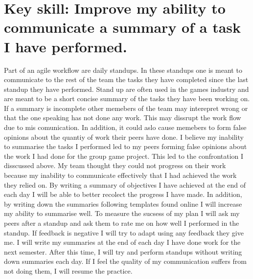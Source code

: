 \documentclass{scrartcl}
\begin{document}
\section{Key skill: Improve my ability to communicate a summary of a task I have performed.}
Part of an agile workflow are daily standups. In these standups one is meant to communicate to the rest of the team the tasks they have completed since the last standup they have performed. Stand up are often used in the games industry and are meant to be a short concise summary of the tasks they have been working on. If a summary is incomplete other memebers of the team may interepret wrong or that the one speaking has not done any work. This may dissrupt the work flow due to mis comunication. In addition, it could aslo cause memebers to form false opinions about the quantiy of work their peers have done. I believe my inability to summarise the tasks I performed led to my peers forming false opinions about the work I had done for the group game project. This led to the confrontation I disscussed above. My team thought they could not progress on their work because my inability to communicate effectively that I had achieved the work they relied on. By writing a summary of objectives I have achieved at the end of each day I will be able to better recolect the progress I have made. In addition, by writing down the summaries following templates found online I will increase my ability to summarise well. To measure the sucsess of my plan I will ask my peers after a standup and ask them to rate me on how well I performed in the standup. If feedback is negative I will try to adapt using any feedback they give me. I will write my summaries at the end of each day I have done work for the next semester. After this time, I will try and perform standups without writing down summaries each day. If I feel the quality of my communication suffers from not doing them, I will resume the practice. 
\end{document}

